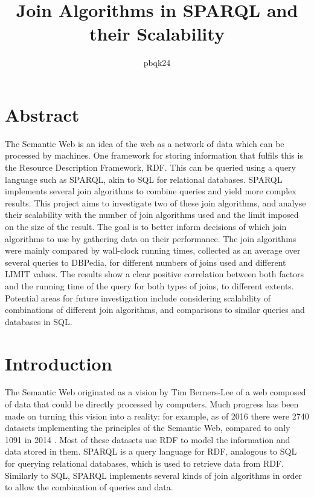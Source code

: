 \documentclass[10pt,a4paper]{article}
\title{\vspace{-3em}Join Algorithms in SPARQL and their Scalability}
\author{pbqk24}
\begin{document}
	\maketitle
	
	\vspace{-3em}
	
	\section*{Abstract}
	
	The Semantic Web is an idea of the web as a network of data which can be processed by machines. One framework for storing information that fulfils this is the Resource Description Framework, RDF. This can be queried using a query language such as SPARQL, akin to SQL for relational databases. SPARQL implements several join algorithms to combine queries and yield more complex results. This project aims to investigate two of these join algorithms, and analyse their scalability with the number of join algorithms used and the limit imposed on the size of the result. The goal is to better inform decisions of which join algorithms to use by gathering data on their performance. The join algorithms were mainly compared by wall-clock running times, collected as an average over several queries to DBPedia, for different numbers of joins used and different LIMIT values. The results show a clear positive correlation between both factors and the running time of the query for both types of joins, to different extents. Potential areas for future investigation include considering scalability of combinations of different join algorithms, and comparisons to similar queries and databases in SQL.
	
	\section*{Introduction}
	The Semantic Web originated as a vision by Tim Berners-Lee of a web composed of data that could be directly processed by computers. Much progress has been made on turning this vision into a reality: for example, as of 2016 there were 2740 datasets implementing the principles of the Semantic Web, compared to only 1091 in 2014 \cite{Bizer}. Most of these datasets use RDF to model the information and data stored in them. SPARQL is a query language for RDF, analogous to SQL for querying relational databases, which is used to retrieve data from RDF. Similarly to SQL, SPARQL implements several kinds of join algorithms in order to allow the combination of queries and data.
	
\end{document}
